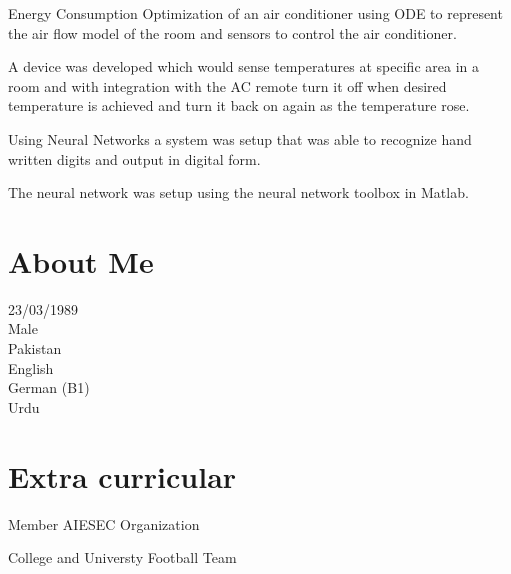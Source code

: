 \documentclass[letterpaper]{deedy-resume} %
\begin{document}
\begin{minipage}[t]{0.66\textwidth}
\begin{tightitemize}
\item Energy Consumption Optimization of an air conditioner using ODE to represent the air
flow model of the room and sensors to control the air conditioner.
\item A device was developed which would sense temperatures at specific area in a room and with integration with the AC remote turn it off when desired temperature is achieved and turn it back on again as the temperature rose.
\end{tightitemize}

\sectionspace %


\descript{}

\begin{tightitemize}
\item Using Neural Networks a system was setup that was able to recognize hand written digits and output in digital form.
\item The neural network was setup using the neural network toolbox in Matlab.
\end{tightitemize}

\sectionspace %


\begin{multicols}{2}
\section{About Me}   
23/03/1989 \\
Male \\
Pakistan \\
\textbullet{} English \\
\textbullet{} German  (B1) \\
\textbullet{} Urdu \\

\columnbreak

\section{Extra curricular}
\bigskip
\begin{tightitemize} 

\item Member AIESEC Organization
\item College and Universty Football Team

\end{tightitemize}
\end{multicols}


\end{minipage} %

\end{document}

